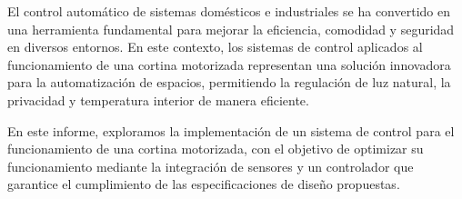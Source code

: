 El control automático de sistemas domésticos e industriales se ha convertido en una herramienta fundamental para mejorar la eficiencia, comodidad y seguridad en diversos entornos. En este contexto, los sistemas de control aplicados al funcionamiento de una cortina motorizada representan una solución innovadora para la automatización de espacios, permitiendo la regulación de luz natural, la privacidad y temperatura interior de manera eficiente.

En este informe, exploramos la implementación de un sistema de control para el funcionamiento de una cortina motorizada, con el objetivo de optimizar su funcionamiento mediante la integración de sensores y un controlador que garantice el cumplimiento de las especificaciones de diseño propuestas.